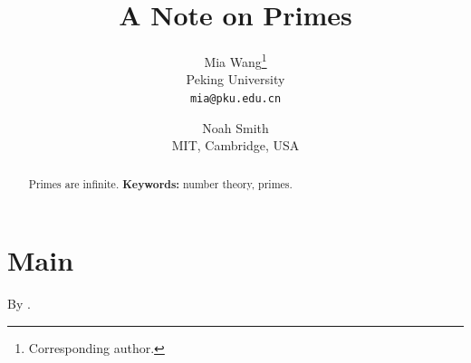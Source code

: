 \documentclass{article}
\title{A Note on Primes}
\author{Mia Wang\thanks{Corresponding author.} \\ Peking University \\ \texttt{mia@pku.edu.cn}
\and Noah Smith \\ MIT, Cambridge, USA}
\begin{document}
\maketitle
\begin{abstract}
Primes are infinite.
\textbf{Keywords:} number theory, primes.
\end{abstract}
\section{Main}
By \citet{knuth}.


\end{document}
